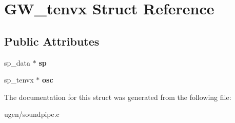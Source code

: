\hypertarget{structGW__tenvx}{}\section{G\+W\+\_\+tenvx Struct Reference}
\label{structGW__tenvx}
\subsection*{Public Attributes}
\begin{DoxyCompactItemize}
\item 
\hypertarget{structGW__tenvx_ae2a6cb3741634e9370e8f187fc66f2ca}{}\label{structGW__tenvx_ae2a6cb3741634e9370e8f187fc66f2ca} 
sp\+\_\+data $\ast$ {\bfseries sp}
\item 
\hypertarget{structGW__tenvx_a5dfed1cacb9cbf7ab0fb2aac96af09f5}{}\label{structGW__tenvx_a5dfed1cacb9cbf7ab0fb2aac96af09f5} 
sp\+\_\+tenvx $\ast$ {\bfseries osc}
\end{DoxyCompactItemize}


The documentation for this struct was generated from the following file\+:\begin{DoxyCompactItemize}
\item 
ugen/soundpipe.\+c\end{DoxyCompactItemize}
